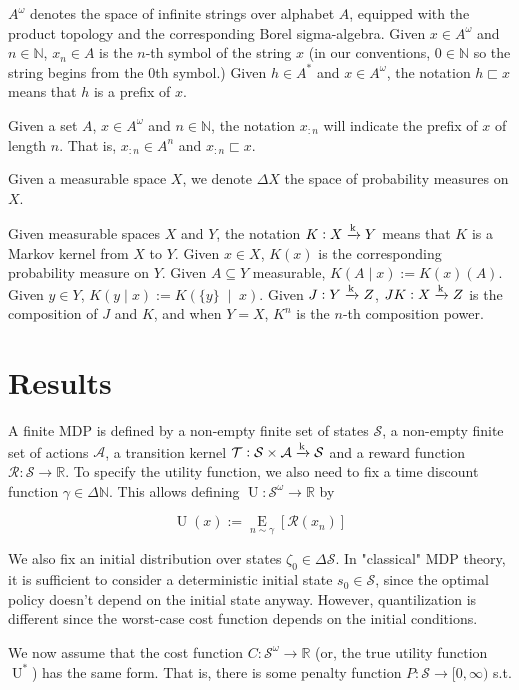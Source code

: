 \documentclass[a4paper]{article}
\newcommand{\AP}[1]{\left(#1\right)}
\newcommand{\AB}[1]{\left[#1\right]}
\newcommand{\APM}[2]{\left(#1\;\middle\vert\;#2\right)}
\newcommand{\Ea}[2]{\underset{#1}{\operatorname{E}}\AB{#2}}
\newcommand{\Nats}{\mathbb{N}}
\newcommand{\Reals}{\mathbb{R}}
\newcommand{\K}{\xrightarrow{\textnormal{k}}}
\newcommand{\A}{\mathcal{A}}
\newcommand{\St}{\mathcal{S}}
\newcommand{\T}{\mathcal{T}}
\newcommand{\R}{\mathcal{R}}
\newcommand{\Pe}{P}
\newcommand{\Ut}{\operatorname{U}}
\newcommand{\Co}{C}
\begin{document}
$A^\omega$ denotes the space of infinite strings over alphabet $A$, equipped with the product topology and the corresponding Borel sigma-algebra. Given $x\in A^\omega$ and $n \in \Nats$, $x_n \in A$ is the $n$-th symbol of the string $x$ (in our conventions, $0 \in \Nats$ so the string begins from the 0th symbol.) Given $h \in A^*$ and $x \in A^\omega$, the notation $h \sqsubset x$ means that $h$ is a prefix of $x$.

Given a set $A$, $x\in A^\omega$ and $n\in\Nats$, the notation $x_{:n}$ will indicate the prefix of $x$ of length $n$. That is, $x_{:n} \in A^n$ and $x_{:n} \sqsubset x$.

Given a measurable space $X$, we denote $\Delta X$ the space of probability measures on $X$.

Given measurable spaces $X$ and $Y$, the notation $K: X \K Y$ means that $K$ is a Markov kernel from $X$ to $Y$. Given $x \in X$, $K(x)$ is the corresponding probability measure on $Y$. Given $A \subseteq Y$ measurable, $K(A \mid x) := K(x)(A)$. Given $y \in Y$, $K(y \mid x):=K\APM{\{y\}}{x}$. Given $J: Y \K Z$, $JK: X \K Z$ is the composition of $J$ and $K$, and when $Y = X$, $K^n$ is the $n$-th composition power.

\section{Results}

A finite MDP is defined by a non-empty finite set of states $\St$, a non-empty finite set of actions $\A$, a transition kernel $\T: \St \times \A \K \St$ and a reward function $\R: \St \rightarrow \Reals$. To specify the utility function, we also need to fix a time discount function $\gamma \in \Delta\Nats$. This allows defining $\Ut: \St^\omega \rightarrow \Reals$ by

$$\Ut(x):=\Ea{n\sim\gamma}{\R\AP{x_n}}$$

We also fix an initial distribution over states $\zeta_0 \in \Delta \St$. In "classical" MDP theory, it is sufficient to consider a deterministic initial state $s_0 \in \St$, since the optimal policy doesn't depend on the initial state anyway. However, quantilization is different since the worst-case cost function depends on the initial conditions.

We now assume that the cost function $\Co: \St^\omega \rightarrow \Reals$ (or, the true utility function $\Ut^*$) has the same form. That is, there is some penalty function $\Pe: \St \rightarrow [0,\infty)$ s.t.
\end{document}
